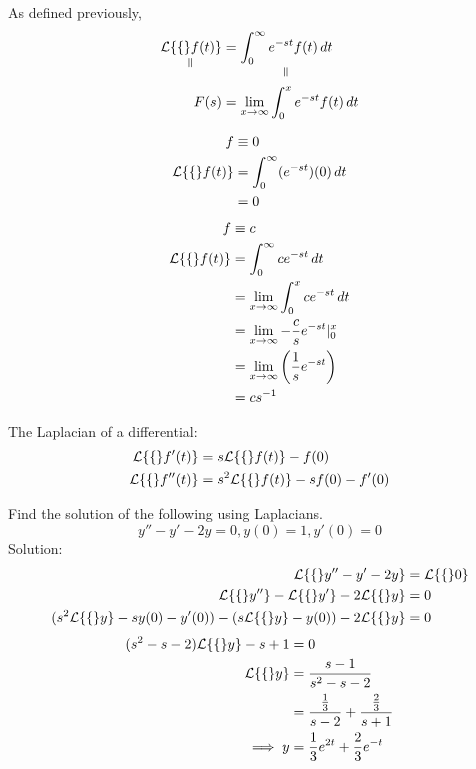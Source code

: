 \documentclass[diffeq.tex]{subfiles}
\begin{document}
    As defined previously,
    \begin{alignat*}{2} %
        \underset{\rotatebox{90}{$\,=$}}{\lp\{f(t)\}} &= \underset{\rotatebox{90}{$\,=$}}{\int_{0}^{\infty}e^{-st}f(t)\,dt}\\
        F(s) &= \lim_{x\to\infty}\int_{0}^{x}e^{-st}f(t)\,dt
    \end{alignat*}
    \begin{example}
        \begin{alignat}{1}
            f &\equiv 0\\
            \mathcal{L}\{\{\}f(t)\} &= \int_{0}^{\infty}(e^{-st})(0)\,dt\\
            &= 0
        \end{alignat}
        \begin{alignat}{1}
            f &\equiv c\\
            \mathcal{L}\{\{\}f(t)\} &= \int_{0}^{\infty}ce^{-st}\,dt\\
            &= \lim_{x\to\infty}\int_{0}^{x}ce^{-st}\,dt\\
            &= \lim_{x\to\infty}-\frac{c}{s}e^{-st}|_{0}^{x}\\
            &= \lim_{x\to\infty}\left(\frac{1}{s}e^{-st}\right)\\
            &= cs^{-1}
        \end{alignat}
    \end{example}
    \begin{theorem}
        The Laplacian of a differential:
        \begin{alignat}{1}
            \mathcal{L}\{\{\}f'(t)\} &= s\mathcal{L}\{\{\}f(t)\} - f(0)\\
            \mathcal{L}\{\{\}f''(t)\} &= s^{2}\mathcal{L}\{\{\}f(t)\}-sf(0)-f'(0)
        \end{alignat}
    \end{theorem}
    \begin{example}
        Find the solution of the following using Laplacians.
        \begin{equation}
            y'' - y' -2y = 0, y(0) = 1, y'(0) = 0
        \end{equation}
        Solution:
        \begin{alignat}{1}
            \mathcal{L}\{\{\}y'' - y' - 2y\} &= \mathcal{L}\{\{\}0\}\\
            \mathcal{L}\{\{\}y''\} - \mathcal{L}\{\{\}y'\} - 2\mathcal{L}\{\{\}y\} &= 0\\
            (s^{2}\mathcal{L}\{\{\}y\} - sy(0) - y'(0)) - (s\mathcal{L}\{\{\}y\} - y(0)) - 2\mathcal{L}\{\{\}y\} &= 0
        \end{alignat}
        \begin{alignat}{1}
            (s^{2} - s - 2)\mathcal{L}\{\{\}y\} - s + 1 &= 0\\
            \mathcal{L}\{\{\}y\} &= \frac{s - 1}{s^{2} - s - 2}\\
            &= \frac{\frac{1}{3}}{s-2} + \frac{\frac{2}{3}}{s+1}\\
            \implies y &= \frac{1}{3}e^{2t} + \frac{2}{3}e^{-t}
        \end{alignat}
    \end{example}
\end{document}
